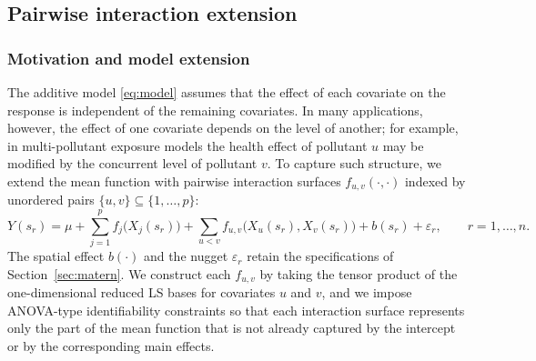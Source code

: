 %
%

\subsection{Pairwise interaction extension}\label{sec:interaction}

\subsubsection{Motivation and model extension}\label{sec:int_motivation}
The additive model \eqref{eq:model} assumes that the effect of each covariate on the response
is independent of the remaining covariates. In many applications, however, the effect of one
covariate depends on the level of another; for example, in multi-pollutant exposure models
the health effect of pollutant $u$ may be modified by the concurrent level of pollutant $v$.
To capture such structure, we extend the mean function with pairwise interaction surfaces
$f_{u,v}(\cdot,\cdot)$ indexed by unordered pairs $\{u,v\}\subseteq\{1,\ldots,p\}$:
\begin{equation}
Y(s_r)=\mu+\sum_{j=1}^{p} f_j\!\big(X_j(s_r)\big)
+\sum_{u<v} f_{u,v}\!\big(X_u(s_r),X_v(s_r)\big)
+b(s_r)+\varepsilon_r,
\qquad r=1,\ldots,n.
\label{eq:model_int}
\end{equation}
The spatial effect $b(\cdot)$ and the nugget $\varepsilon_r$ retain the specifications of
Section~\ref{sec:matern}. We construct each $f_{u,v}$ by taking the tensor product of the
one-dimensional reduced LS bases for covariates $u$ and $v$, and we impose ANOVA-type
identifiability constraints so that each interaction surface represents only the part of the
mean function that is not already captured by the intercept or by the corresponding main
effects.

